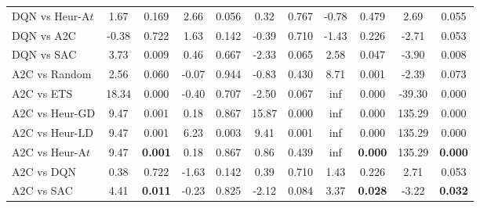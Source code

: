 \begin{tabular}{lcccccccccc}
	DQN vs Heur-A$t$ & 1.67          & 0.169                  & 2.66          & 0.056                  & 0.32           & 0.767                 & -0.78         & 0.479                  & 2.69           & 0.055                 \\
	DQN vs A2C       & -0.38         & 0.722                  & 1.63          & 0.142                  & -0.39          & 0.710                 & -1.43         & 0.226                  & -2.71          & 0.053                 \\
	DQN vs SAC       & 3.73          & 0.009                  & 0.46          & 0.667                  & -2.33          & 0.065                 & 2.58          & 0.047                  & -3.90          & 0.008                 \\
	\midrule 
	A2C vs Random    & 2.56          & 0.060                  & -0.07         & 0.944                  & -0.83          & 0.430                 & 8.71          & 0.001                  & -2.39          & 0.073                 \\
	A2C vs ETS       & 18.34         & 0.000                  & -0.40         & 0.707                  & -2.50          & 0.067                 & inf           & 0.000                  & -39.30         & 0.000                 \\
	A2C vs Heur-GD   & 9.47          & 0.001                  & 0.18          & 0.867                  & 15.87          & 0.000                 & inf           & 0.000                  & 135.29         & 0.000                 \\
	A2C vs Heur-LD   & 9.47          & 0.001                  & 6.23          & 0.003                  & 9.41           & 0.001                 & inf           & 0.000                  & 135.29         & 0.000                 \\
	A2C vs Heur-A$t$ & 9.47          & \textbf{0.001}         & 0.18          & 0.867                  & 0.86           & 0.439                 & inf           & \textbf{0.000}         & 135.29         & \textbf{0.000}        \\
	A2C vs DQN       & 0.38          & 0.722                  & -1.63         & 0.142                  & 0.39           & 0.710                 & 1.43          & 0.226                  & 2.71           & 0.053                 \\
	A2C vs SAC       & 4.41          & \textbf{0.011}         & -0.23         & 0.825                  & -2.12          & 0.084                 & 3.37          & \textbf{0.028}         & -3.22          & \textbf{0.032}        \\

\end{tabular}
